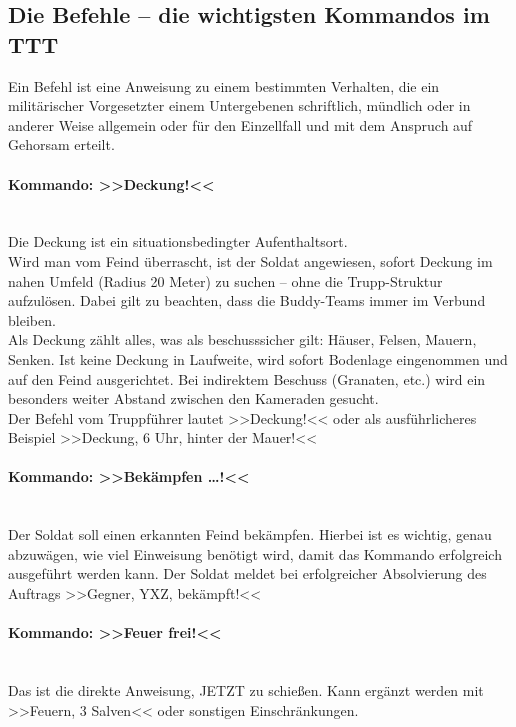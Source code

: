 \subsection{Die Befehle -- die wichtigsten Kommandos im TTT}
	Ein Befehl ist eine Anweisung zu einem bestimmten Verhalten, die ein militärischer Vorgesetzter einem Untergebenen schriftlich, mündlich oder in anderer Weise allgemein oder für den Einzellfall und mit dem Anspruch auf Gehorsam erteilt.

\paragraph*{Kommando: >>Deckung!<<}\hfil\\
	Die Deckung ist ein situationsbedingter Aufenthaltsort.\\ 
	Wird man vom Feind überrascht, ist der Soldat angewiesen, sofort Deckung im nahen Umfeld (Radius 20 Meter) zu suchen – ohne die Trupp-Struktur aufzulösen. Dabei gilt zu beachten, dass die Buddy-Teams immer im Verbund bleiben. \\
	Als Deckung zählt alles, was als beschusssicher gilt: Häuser, Felsen, Mauern, Senken. Ist keine Deckung in Laufweite, wird sofort Bodenlage eingenommen und auf den Feind ausgerichtet. Bei indirektem Beschuss (Granaten, etc.) wird ein besonders weiter Abstand zwischen den Kameraden gesucht.\\

	Der Befehl vom Truppführer lautet >>Deckung!<< oder als ausführlicheres Beispiel >>Deckung, 6 Uhr, hinter der Mauer!<<

\paragraph*{Kommando: >>Bekämpfen …!<<}\hfil\\
	Der Soldat soll einen erkannten Feind bekämpfen. Hierbei ist es wichtig, genau abzuwägen, wie viel Einweisung benötigt wird, damit das Kommando erfolgreich ausgeführt werden kann. Der Soldat meldet bei erfolgreicher Absolvierung des Auftrags >>Gegner, YXZ, bekämpft!<<

\paragraph*{Kommando: >>Feuer frei!<<}\hfil\\
	Das ist die direkte Anweisung, JETZT zu schießen. Kann ergänzt werden mit >>Feuern, 3 Salven<< oder sonstigen Einschränkungen.

